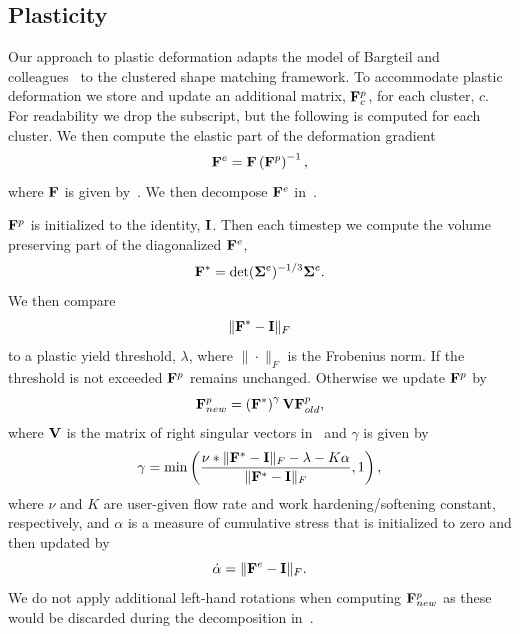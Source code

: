 \documentclass[conference]{acmsiggraph}
\begin{document}
\subsection{Plasticity}
\label{sec:Plasticity}
Our approach to plastic deformation adapts the model of Bargteil and colleagues~
to the clustered shape matching framework.
To accommodate plastic deformation we store and update an additional matrix, $\mathit{\mathbf{F}}^p_c$, for each cluster, $c$.
For readability we drop the subscript, but the following is computed for each cluster.
We then compute the elastic part of the deformation gradient
\begin{equation}
\mathit{\mathbf{F}}^e = \mathit{\mathbf{F}} \left(\mathit{\mathbf{F}}^p\right)^{-1},
\end{equation}
where $\mathit{\mathbf{F}}$ is given by~.  We then decompose $\mathit{\mathbf{F}}^e$ in~.

$\mathit{\mathbf{F}}^p$ is initialized to the identity, $\mathit{\mathbf{I}}$.  Then each timestep we compute the volume preserving part 
of the diagonalized $\mathit{\mathbf{F}}^e$,
\begin{equation}
\mathit{\mathbf{F}}^* = \det(\mathit{\mathbf{\Sigma}}^e)^{-1/3}\mathit{\mathbf{\Sigma}}^e.
\end{equation}
We then compare
\begin{equation}
\|\mathit{\mathbf{F}}^* - \mathit{\mathbf{I}}\|_F
\end{equation}
to a plastic yield threshold, $\lambda$, where $\|\cdot\|_F$ is the Frobenius norm.  If the threshold
is not exceeded $\mathit{\mathbf{F}}^p$ remains unchanged.  Otherwise we update $\mathit{\mathbf{F}}^p$ by
\begin{equation}
\mathit{\mathbf{F}}^p_{new} = \left(\mathit{\mathbf{F}}^*\right)^\gamma\mathit{\mathbf{V}}\mathit{\mathbf{F}}^p_{old},
\end{equation}
where $\mathit{\mathbf{V}}$ is the matrix of right singular vectors in~ and $\gamma$ is given by
\begin{equation}
\gamma = \min\left(\frac{\nu * \|\mathit{\mathbf{F}}^* - \mathit{\mathbf{I}}\|_F - \lambda - K\alpha}{\|\mathit{\mathbf{F}}^* - \mathit{\mathbf{I}}\|_F},1\right),
\end{equation}
where $\nu$ and $K$ are user-given flow rate and work hardening/softening constant, respectively, 
and $\alpha$ is a measure of cumulative stress that is initialized to zero and then updated by
\begin{equation}
\dot{\alpha} = \|\mathit{\mathbf{F}}^e-\mathit{\mathbf{I}}\|_F.
\end{equation}
We do not apply additional left-hand rotations when computing $\mathit{\mathbf{F}}^p_{new}$ as these would be discarded during
the decomposition in~.
\end{document}
